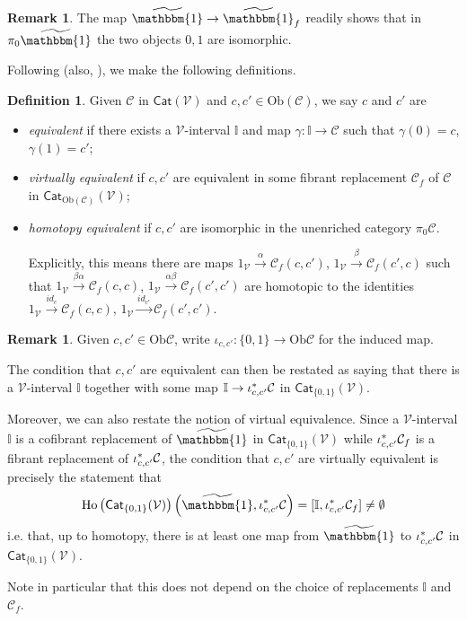 \documentclass[a4paper,10pt
,draft
]{article}%
\numberwithin{equation}{section}
\numberwithin{figure}{section}
\theoremstyle{definition} %
\newtheorem{definition}[equation]{Definition}%
\newtheorem{remark}[equation]{Remark}%
\newcommand{\Cat}{\mathsf{Cat}}
\DeclareMathOperator{\Ho}{Ho}
\newcommand{\V}{\ensuremath{\mathcal V}}
\newcommand{\1}{\ensuremath{\mathbbm 1}}%
\begin{document}
\begin{remark}\label{NATISO REM}
The map $\widetilde{\mathbbm{1}} \to \widetilde{\mathbbm{1}}_f$
readily shows that in $\pi_0 \widetilde{\mathbbm{1}}$
the two objects $0,1$ are isomorphic.
\end{remark}




Following \cite[Def. 2.6]{BM13} (also, \cite{Cav}),
we make the following definitions.

\begin{definition}\label{EQUIV_DEF}
	Given $\mathcal{C}$ in  $\Cat(\V)$ and $c,c'\in\mathrm{Ob}(\mathcal C)$, we say $c$ and $c'$ are
\begin{itemize}
	\item {\em equivalent} if there exists a $\V$-interval $\mathbb{I}$
	and map $\gamma: \mathbb{I} \to \mathcal C$ such that
	$\gamma(0)= c$, $\gamma(1)= c'$;
	\item {\em virtually equivalent} if $c,c'$ are equivalent in some fibrant replacement
	$\mathcal C_f$ of $\mathcal C$ in $\Cat_{\mathrm{Ob}(\mathcal C)}(\V)$;
	\item {\em homotopy equivalent} if $c,c'$ are isomorphic in the unenriched category $\pi_0 \mathcal C$.

	Explicitly, this means there are maps 
	$1_\V \xrightarrow{\alpha} \mathcal C_f(c,c')$, 
	$1_\V \xrightarrow{\beta} \mathcal C_f(c',c)$ such that
	$1_{\V} \xrightarrow{\beta \alpha} \mathcal C_f(c,c)$,
	$1_{\V} \xrightarrow{\alpha \beta} \mathcal C_f(c',c')$
	are homotopic to the identities
	$1_{\V} \xrightarrow{id_c} \mathcal C_f(c,c)$,
	$1_{\V} \xrightarrow{id_{c'}} \mathcal C_f(c',c')$.
\end{itemize}
\end{definition}



\begin{remark}\label{VIRTEQRESTA REM}
Given $c,c' \in \mathrm{Ob}{\mathcal{C}}$, write $\iota_{c,c'} \colon \{0,1\} \to \mathrm{Ob}{\mathcal{C}}$
for the induced map.

The condition that $c,c'$ are equivalent can then be restated as saying that
there is a $\V$-interval $\mathbb{I}$
together with some map $\mathbb{I} \to \iota^{\**}_{c,c'}\mathcal{C}$ in $\mathsf{Cat}_{\{0,1\}}(\V)$. 

Moreover, we can also restate the notion of virtual equivalence.
Since a $\V$-interval $\mathbb{I}$ is a cofibrant replacement of $\widetilde{\mathbbm{1}}$ in $\mathsf{Cat}_{\{0,1\}}(\V)$
while $\iota^{\**}_{c,c'} \mathcal{C}_f$ is a fibrant replacement of $\iota^{\**}_{c,c'} \mathcal{C}$,
the condition that $c,c'$ are virtually equivalent is precisely the statement that
\[
\Ho \left(\mathsf{Cat}_{\{0,1\}}(\V)\right)\left(\widetilde{\mathbbm{1}},\iota^{\**}_{c,c'} \mathcal{C}\right)
=
[\mathbb{I},\iota^{\**}_{c,c'} \mathcal{C}_f] 
\neq
 \emptyset
\]
i.e. that, up to homotopy, there is at least one map from $\widetilde{\mathbbm{1}}$ to $\iota^{\**}_{c,c'} \mathcal{C}$
in $\mathsf{Cat}_{\{0,1\}}(\V)$.

Note in particular that this does not depend on the choice of %
replacements 
$\mathbb{I}$ and $\mathcal{C}_f$.
\end{remark}
\end{document}
